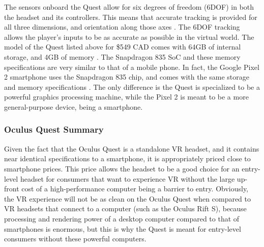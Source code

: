 The sensors onboard the Quest allow for six degrees of freedom (6DOF) in both the headset
and its controllers. This means that accurate tracking is provided for all three dimensions,
and orientation along those axes \cite{sixdof_defn}. The 6DOF tracking allows the player's
inputs to be as accurate as possible in the virtual world. The model of the Quest 
listed above for \$549 CAD comes with 64GB of internal storage, and 4GB of memory
\cite{quest_timemag}. The Snapdragon 835 SoC and these memory specifications
are very similar to that of a mobile phone. In fact, the Google Pixel 2 smartphone
uses the Snapdragon 835 chip, and comes with the same storage and memory
specifications \cite{quest_polygon}. The only difference is the Quest is
specialized to be a powerful graphics processing machine, while the Pixel 2
is meant to be a more general-purpose device, being a smartphone.

\subsubsection{Oculus Quest Summary}
Given the fact that the Oculus Quest is a standalone VR headset, and it contains
near identical specifications to a smartphone, it is appropriately priced close to
smartphone prices. This price allows the headset to be a good choice for an 
entry-level headset for consumers that want to experience VR without the 
large up-front cost of a high-performance computer being a barrier to entry.
Obviously, the VR experience will not be as clean on the Oculus Quest when compared
to VR headsets that connect to a computer (such as the Oculus Rift S), because processing
and rendering power of a desktop computer compared to that of smartphones is enormous,
but this is why the Quest is meant for entry-level consumers without these powerful
computers.